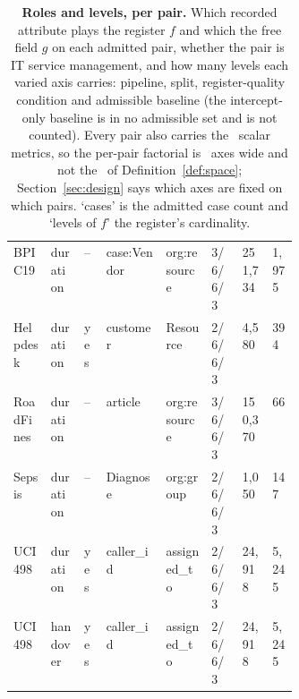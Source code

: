 \begin{table}[t]
{\begin{tabular}{lll>{\raggedright\arraybackslash}p{0.210\linewidth}>{\raggedright\arraybackslash}p{0.160\linewidth}lll}
BPIC19 & duration & -- & case:\discretionary{}{}{}Vendor & org:\discretionary{}{}{}resource & 3/6/6/3 & 251,734 & 1,975 \\
Helpdesk & duration & yes & customer & Resource & 2/6/6/3 & 4,580 & 394 \\
RoadFines & duration & -- & article & org:\discretionary{}{}{}resource & 3/6/6/3 & 150,370 & 66 \\
Sepsis & duration & -- & Diagnose & org:\discretionary{}{}{}group & 2/6/6/3 & 1,050 & 147 \\
UCI498 & duration & yes & caller\_id & assigned\_to & 2/6/6/3 & 24,918 & 5,245 \\
UCI498 & handover & yes & caller\_id & assigned\_to & 2/6/6/3 & 24,918 & 5,245 \\
\bottomrule
\end{tabular}%
}
\caption{\textbf{Roles and levels, per pair.} Which recorded attribute plays the register $f$ and which the free field $g$ on each admitted pair, whether the pair is IT service management, and how many levels each varied axis carries: pipeline, split, register-quality condition and admissible baseline (the intercept-only baseline is in no admissible set and is not counted). Every pair also carries the \nInstruments\ scalar metrics, so the per-pair factorial is \nPerPairAxes\ axes wide and not the \nAxes\ of Definition~\ref{def:space}; Section~\ref{sec:design} says which axes are fixed on which pairs. `cases' is the admitted case count and `levels of $f$' the register's cardinality.}
\label{tab:roles}
\end{table}

